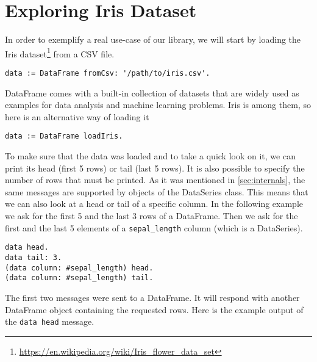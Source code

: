 \documentclass[sigplan]{acmart}
\begin{document}
\section{Exploring Iris Dataset}
\label{sec:iris-eda}
%
%

In order to exemplify a real use-case of our library, we will start by loading the Iris dataset\footnote{\url{https://en.wikipedia.org/wiki/Iris_flower_data_set}} from a CSV file.

\begin{lstlisting}[basicstyle=\small,language=Smalltalk]
data := DataFrame fromCsv: '/path/to/iris.csv'.
\end{lstlisting}

DataFrame comes with a built-in collection of datasets that are widely used as examples for data analysis and machine learning problems. Iris is among them, so here is an alternative way of loading it

\begin{lstlisting}[basicstyle=\small,language=Smalltalk]
data := DataFrame loadIris.
\end{lstlisting}

To make sure that the data was loaded and to take a quick look on it, we can print its head (first 5 rows) or tail (last 5 rows). It is also possible to specify the number of rows that must be printed. As it was mentioned in \ref{sec:internals}, the same messages are supported by objects of the DataSeries class. This means that we can also look at a head or tail of a specific column. In the following example we ask for the first 5 and the last 3 rows of a DataFrame. Then we ask for the first and the last 5 elements of a \texttt{sepal\_length} column (which is a DataSeries).

\begin{lstlisting}[basicstyle=\small,language=Smalltalk]
data head.
data tail: 3.
(data column: #sepal_length) head.
(data column: #sepal_length) tail.
\end{lstlisting}

The first two messages were sent to a DataFrame. It will respond with another DataFrame object containing the requested rows. Here is the example output of the \texttt{data head} message.
\end{document}
